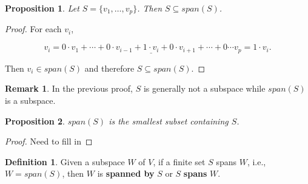 \documentclass[12pt]{article}
\newtheorem*{proposition}{Proposition}
\theoremstyle{definition}
\newtheorem*{definition}{Definition}
\newtheorem*{remark}{Remark}
\begin{document}
\begin{proposition}
Let $S = \{ v_1, \ldots, v_p \}$. Then $S \subseteq span(S)$.
\end{proposition}

\begin{proof}
For each $v_i$,

\[
v_i = 0 \cdot v_1 + \cdots + 0 \cdot v_{i-1} + \underline{1 \cdot v_i} + 0 \cdot 
v_{i + 1} + \cdots + 0 \cdots v_p = 1 \cdot v_i.
\]

Then $v_i \in span(S)$ and therefore $S \subseteq span(S)$.
\end{proof}

\begin{remark}
In the previous proof, $S$ is generally not a subspace while $span(S)$ is a subspace.
\end{remark}

\begin{proposition}
$span(S)$ is the smallest subset containing $S$.
\end{proposition}

\begin{proof}
Need to fill in
\end{proof}

\begin{definition}
Given a subspace $W$ of $V$, if a finite set $S$ spans $W$, i.e., $W = span(S)$, then
$W$ is \textbf{spanned by} $S$ or $S$ \textbf{spans} $W$.
\end{definition}
\end{document}
